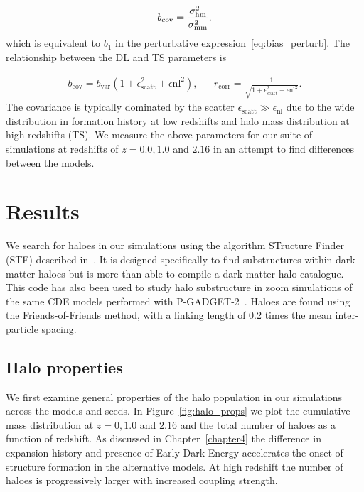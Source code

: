 \begin{equation}
b_{\mathrm{cov}} = \frac{\sigma_{\mathrm{hm}}^2}{\sigma_{\mathrm{mm}}^2}. \\
\end{equation}
which is equivalent to $b_1$ in the perturbative expression~\ref{eq:bias_perturb}. The relationship between the DL and TS parameters is

\begin{align}
\label{eq:bcov}
b_{\mathrm{cov}} = b_{\mathrm{var}} (1 + \epsilon_{\mathrm{scatt}}^2 + \epsilon{\mathrm{nl}}^2), &&
r_{\mathrm{corr}} = \frac{1}{\sqrt{1 + \epsilon_{\mathrm{scatt}}^2 + \epsilon{\mathrm{nl}}^2} }.
\end{align}
The covariance is typically dominated by the scatter $\epsilon_{\mathrm{scatt}} \gg \epsilon_{\mathrm{nl}}$ due to the wide distribution in formation history at low redshifts and halo mass distribution at high redshifts (TS). %
We measure the above parameters for our suite of simulations at redshifts of $z=0.0, 1.0$ and $2.16$ in an attempt to find differences between the models.

\section{Results}

We search for haloes in our simulations using the algorithm STructure Finder (\textsc{STF}) described in~\citet{Elahi2011}. It is designed specifically to find substructures within dark matter haloes but is more than able to compile a dark matter halo catalogue. This code has also been used to study halo substructure in zoom simulations of the same CDE models performed with \textsc{P-GADGET-2}~\citep{Elahi2015}. Haloes are found using the Friends-of-Friends method, with a linking
length of 0.2 %
 times the mean inter-particle spacing.



\subsection{Halo properties}

We first examine general properties of the halo population in our simulations across the models and seeds. In Figure~\ref{fig:halo_props} we plot the cumulative mass distribution at $z=0, 1.0$ and $2.16$ and the total number of haloes as a function of redshift. As discussed in Chapter~\ref{chapter4} the difference in expansion history and presence of Early Dark Energy accelerates the onset of structure formation in the alternative models. At high redshift the number of haloes is progressively larger with increased coupling strength.





